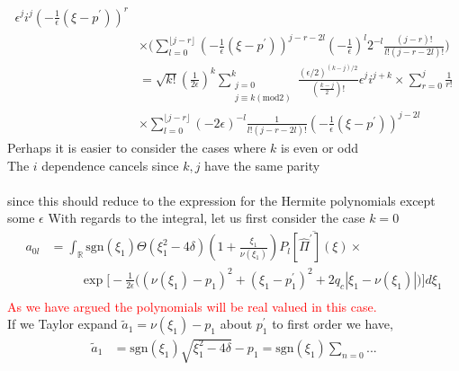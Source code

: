 \documentclass[12pt]{article}
\numberwithin{equation}{section}
\begin{document}
\begin{appendices}
\begin{equation}
\begin{split}
      \epsilon^j
      i^j\left( -\frac{1}{\epsilon}(\xi-p^\prime) \right)^r
    \\
    &\times 
    \Bigg(
    \sum_{l=0}^{\lfloor{j-r}\rfloor}
    \left(-\frac{1}{\epsilon}(\xi - p^\prime)
    \right)^{j - r -2l}\left( -\frac{1}{\epsilon}\right)^l
    2^{-l}\frac{(j-r)!}{l!(j - r -2l)!}
  \Bigg)
  \\
    &
    = \sqrt{k!} \left( \frac{1}{2\epsilon} \right)^k
    \sum_{\substack{j=0 \\ j \equiv k (\text{mod} 2)}}^k \frac{(\epsilon/2)^{(k-j)/2}}{(\frac{k-j}{2})!}
      \epsilon^j
      i^{j + k}
    \times
    \sum_{r=0}^j \frac{1}{r!} 
    \\
    &\times 
    \sum_{l=0}^{\lfloor{j-r}\rfloor}
    (-2\epsilon)^{-l}\frac{1}{l!(j - r -2l)!}
    \left(-\frac{1}{\epsilon}(\xi - p^\prime)
    \right)^{j -2l}
  \end{split}
\end{equation}
Perhaps it is easier to consider the cases where $k$ is 
even or odd
\\
The $i$ dependence cancels since $k,j$ have the same parity 
\\
\\
since this should reduce to the expression for the Hermite 
polynomials except some $\epsilon$
With regards to the integral, let us first consider the case $k=0$
\begin{equation}
  \begin{split}
    a_{0l} &=  
    \int_{\mathbb{R}} \text{sgn}(\xi_1) \Theta(\xi_1^2 - 4\delta)\left( 1 + \frac{\xi_1}{\nu(\xi_1)} \right)
      \overline{ P_l[\hat{\Pi}^\prime](\xi)} 
    \times 
    \\
    &
    \hspace{1cm}
    \exp \Bigg[-\frac{1}{2\epsilon} 
        \Big( (\nu(\xi_1) - p_1)^2 + (\xi_1 - p_1^\prime)^2
    + 2q_c|\xi_1 - \nu(\xi_1)|
      \Big) 
    \Bigg]  d \xi_1 
    \\
  \end{split}
\end{equation}
\textcolor{red}{As we have argued the polynomials will be real valued in this case.}
\\
If we Taylor expand $\tilde{a}_1 = \nu(\xi_1) - p_1$ about $p_1^\prime$ to first order we have,
\begin{equation}
  \begin{split}
    \tilde{a}_1 &= \text{sgn}(\xi_1)\sqrt{\xi_1^2 - 4\delta} - p_1
  =
  \text{sgn}(\xi_1) \sum_{n=0} ...
  \\

\end{split}
\end{equation}
\end{appendices}
\end{document}
